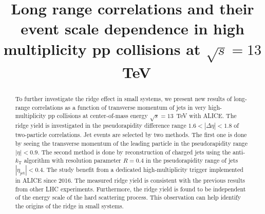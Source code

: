 \documentclass[ALICE,manyauthors]{cernphprep}
\begin{document}
\begin{titlepage}

\PHyear{}
\PHdate{\today}
%

\title{Long range correlations and their event scale dependence in high multiplicity pp collisions at $\sqrt{s} = 13$~TeV}


\begin{abstract}
%


To further investigate the ridge effect in small systems, we present new results of long-range correlations as a function of transverse momentum of jets in very high-multiplicity pp collisions at center-of-mass energy $\sqrt{s} = 13$~TeV with ALICE. The ridge yield is investigated in the pseudorapidity difference range $1.6<|\Delta \eta|<1.8$ of two-particle correlations. Jet events are selected by two methods. The first one is done by seeing the transverse momentum of  the leading particle in the pseudorapidity range $|\eta|<0.9$.  The second method is done by reconstruction of charged jets using the anti-$k_\mathrm{T}$ algorithm with resolution parameter $R=0.4$ in the pseudorapidity range of jets $|\eta_\mathrm{jet}|<0.4$. The study benefit from a dedicated high-multiplicity trigger implemented in ALICE since 2016. The measured ridge yield is consistent with the previous results from other LHC experiments. Furthermore, the ridge yield is found to be independent of the energy scale of the hard scattering process. This observation can help identify the origins of the ridge in small systems.


\end{abstract}

\end{titlepage}
\end{document}
